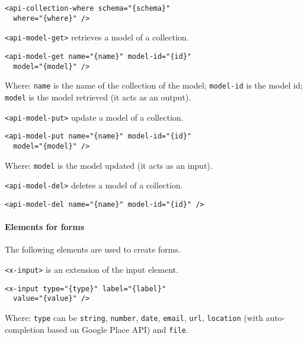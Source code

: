 \begin{lstlisting}[language=HTML5]
<api-collection-where schema="{schema}"
  where="{where}" />
\end{lstlisting}

\texttt{<api-model-get>} retrieves a model of a collection. 

\begin{lstlisting}[language=HTML5]
<api-model-get name="{name}" model-id="{id}" 
  model="{model}" />
\end{lstlisting}

Where: 
\texttt{name} is the name of the collection of the model; 
\texttt{model-id} is the model id; 
\texttt{model} is the model retrieved (it acts as an output).

\texttt{<api-model-put>} update a model of a collection. 

\begin{lstlisting}[language=HTML5]
<api-model-put name="{name}" model-id="{id}" 
  model="{model}" />
\end{lstlisting}

Where: 
\texttt{model} is the model updated (it acts as an input).

\vspace{0.2cm}

\texttt{<api-model-del>} deletes a model of a collection. 

\begin{lstlisting}[language=HTML5]
<api-model-del name="{name}" model-id="{id}" />
\end{lstlisting}

\paragraph{Elements for forms}
The following elements are used to create forms. 

\vspace{0.2cm}

\texttt{<x-input>} is an extension of the input element. 

\begin{lstlisting}[language=HTML5]
<x-input type="{type}" label="{label}"
  value="{value}" />
\end{lstlisting}

Where: 
\texttt{type} can be \texttt{string}, \texttt{number}, \texttt{date}, \texttt{email}, \texttt{url}, \texttt{location} (with auto-completion based on Google Place API) and \texttt{file}.

\vspace{0.2cm}

